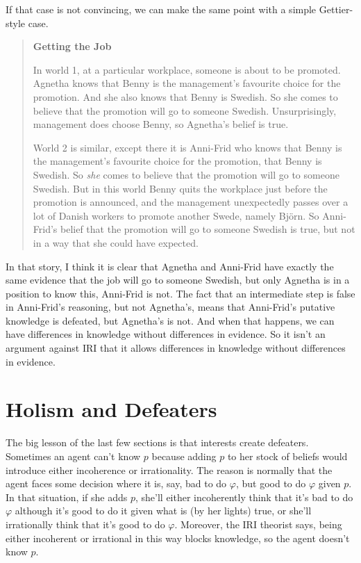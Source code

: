 \documentclass[oneside]{book}
\begin{document}
If that case is not convincing, we can make the same point with a simple Gettier-style case.

\begin{quote}
\textbf{Getting the Job}

In world 1, at a particular workplace, someone is about to be promoted. Agnetha knows that Benny is the management's favour\-ite choice for the promotion. And she also knows that Benny is Swedish. So she comes to believe that the promotion will go to someone Swedish. Unsurprisingly, management does choose Benny, so Agnetha's belief is true.

World 2 is similar, except there it is Anni-Frid who knows that Benny is the management's favourite choice for the promotion, that Benny is Swedish. So \textit{she} comes to believe that the promotion will go to someone Swedish. But in this world Benny quits the workplace just before the promotion is announced, and the management unexpectedly passes over a lot of Danish workers to promote another Swede, namely Bj\"orn. So Anni-Frid's belief that the  promotion will go to someone Swedish is true, but not in a way that she could have expected.
\end{quote}

\noindent In that story, I think it is clear that Agnetha and Anni-Frid have exactly the same evidence that the job will go to someone Swedish, but only Agnetha is in a position to know this, Anni-Frid is not. The fact that an intermediate step is false in Anni-Frid's reasoning, but not Agnetha's, means that Anni-Frid's putative knowledge is defeated, but Agnetha's is not. And when that happens, we can have differences in knowledge without differences in evidence. So it isn't an argument against IRI that it allows differences in knowledge without differences in evidence.

\section{Holism and Defeaters} \label{sect:holism}
The big lesson of the last few sections is that interests create defeaters. Sometimes an agent can't know $p$ because adding $p$ to her stock of beliefs would introduce either incoherence or irrationality. The reason is normally that the agent faces some decision where it is, say, bad to do $\varphi$, but good to do $\varphi$ given $p$. In that situation, if she adds $p$, she'll either incoherently think that it's bad to do $\varphi$ although it's good to do it given what is (by her lights) true, or she'll irrationally think that it's good to do $\varphi$. Moreover, the IRI theorist says, being either incoherent or irrational in this way blocks knowledge, so the agent doesn't know $p$.
\end{document}
